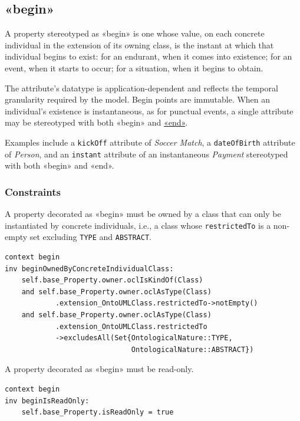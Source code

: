 \subsection{«begin»}
\label{stereotype:begin}
 
A property stereotyped as «begin» is one whose value, on each concrete individual in the extension of its owning class, is the instant at which that individual begins to exist: for an endurant, when it comes into existence; for an event, when it starts to occur; for a situation, when it begins to obtain.
 
The attribute's datatype is application-dependent and reflects the temporal granularity required by the model. Begin points are immutable. When an individual's existence is instantaneous, as for punctual events, a single attribute may be stereotyped with both «begin» and \hyperref[stereotype:end]{«end»}.
 
Examples include a \texttt{kickOff} attribute of \textit{Soccer Match}, a \texttt{dateOfBirth} attribute of \textit{Person}, and an \texttt{instant} attribute of an instantaneous \textit{Payment} stereotyped with both «begin» and «end».
 
\subsubsection{Constraints}

\begin{constraint}
\label{beginOwnedByConcreteIndividualClass}
A property decorated as «begin» must be owned by a class that can only be instantiated by concrete individuals, i.e., a class whose \texttt{restrictedTo} is a non-empty set excluding \texttt{TYPE} and \texttt{ABSTRACT}.
 
\begin{lstlisting}[language=OCL]
context begin
inv beginOwnedByConcreteIndividualClass:
    self.base_Property.owner.oclIsKindOf(Class)
    and self.base_Property.owner.oclAsType(Class)
            .extension_OntoUMLClass.restrictedTo->notEmpty()
    and self.base_Property.owner.oclAsType(Class)
            .extension_OntoUMLClass.restrictedTo
            ->excludesAll(Set{OntologicalNature::TYPE,
                              OntologicalNature::ABSTRACT})
\end{lstlisting}
\end{constraint}
 
\begin{constraint}
\label{beginIsReadOnly}
A property decorated as «begin» must be read-only.
 
\begin{lstlisting}[language=OCL]
context begin
inv beginIsReadOnly:
    self.base_Property.isReadOnly = true
\end{lstlisting}
\end{constraint}

